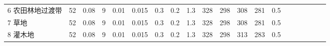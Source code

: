 \begin{sidewaystable}[]
\begin{tabular}{@{}lccccccccccccccccccc@{}}
    6 农田林地过渡带      & 52                                                                & 0.08                                                                                                   & 9                                                                                  & 0.01                                                                               & 0.015                                                               & 0.3                                                       & 0.2                                                       & 1.3                                                       & 328                                                             & 298                                                             & 308                                                              & 281                                                               & 0.5                                                          \\
    7 草地           & 52                                                                & 0.08                                                                                                   & 9                                                                                  & 0.01                                                                               & 0.015                                                               & 0.3                                                       & 0.2                                                       & 1.3                                                       & 328                                                             & 298                                                             & 308                                                              & 281                                                               & 0.5                                                          \\
    8 灌木地          & 52                                                                & 0.08                                                                                                   & 9                                                                                  & 0.01                                                                               & 0.015                                                               & 0.3                                                       & 0.2                                                       & 1.3                                                       & 328                                                             & 298                                                             & 313                                                              & 283                                                               & 0.5                                                          \\

\end{tabular}
\end{sidewaystable}
